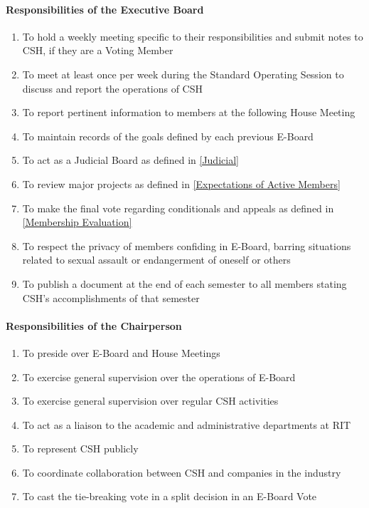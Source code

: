 \documentclass{article}
\newcommand{\asubsubsection}[1]{\paragraph{#1} \label{#1}}
\begin{document}
\asubsubsection{Responsibilities of the Executive Board}
\renewcommand{\theenumi}{\arabic{enumi}} %
\begin{enumerate}
	\item To hold a weekly meeting specific to their responsibilities and submit notes to CSH, if they are a Voting Member
	\item To meet at least once per week during the Standard Operating Session to discuss and report the operations of CSH
	\item To report pertinent information to members at the following House Meeting
	\item To maintain records of the goals defined by each previous E-Board
	\item To act as a Judicial Board as defined in \ref{Judicial}
	\item To review major projects as defined in \ref{Expectations of Active Members}
	\item To make the final vote regarding conditionals and appeals as defined in \ref{Membership Evaluation}
	\item To respect the privacy of members confiding in E-Board, barring situations related to sexual assault or endangerment of oneself or others
	\item To publish a document at the end of each semester to all members stating CSH's accomplishments of that semester
\end{enumerate}

\asubsubsection{Responsibilities of the Chairperson}
\begin{enumerate}
	\item To preside over E-Board and House Meetings
	\item To exercise general supervision over the operations of E-Board
	\item To exercise general supervision over regular CSH activities
	\item To act as a liaison to the academic and administrative departments at RIT
	\item To represent CSH publicly
	\item To coordinate collaboration between CSH and companies in the industry
	\item To cast the tie-breaking vote in a split decision in an E-Board Vote
\end{enumerate}
\end{document}
